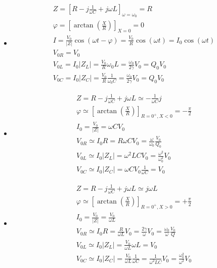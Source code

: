 \begin{itemize}
  \item[$\omega=\omega_0$]
    \begin{gather}
      Z = \left[R-j\frac{1}{\omega C}+j\omega L\right]_{\omega=\omega_0}=R\\
      \varphi = \left[\arctan\left(\frac{X}{R}\right)\right]_{X=0}=0\\
      I = \frac{V_0}{|Z|}\cos\left(\omega t-\varphi\right)=\frac{V_0}{R}\cos(\omega t)=I_0\cos(\omega t)\\
      V_{0R}=V_0\\
      V_{0L}=I_0|Z_L|=\frac{V_0}{R}\omega_0 L=\frac{\omega_0}{2\gamma}V_0=Q_0V_0\\
      V_{0C}=I_0|Z_C|=\frac{V_0}{R}\frac{1}{\omega_0 C}=\frac{\omega_0}{2\gamma}V_0=Q_0V_0
    \end{gather}
  \item[$\omega\ll\omega_0$]
    \begin{gather}
      Z=R-j\frac{1}{\omega C}+j\omega L\simeq -\frac{1}{\omega C}j\\
      \varphi \simeq \left[\arctan\left(\frac{X}{R}\right)\right]_{R=0^+,X<0}=-\frac{\pi}{2}\\
      I_0 = \frac{V_0}{|Z|}=\omega C V_0\\
      V_{0R}\simeq I_0R=R\omega C V_0=\frac{\omega}{\omega_0}\frac{V_0}{Q_0}\\
      V_{0L}\simeq I_0|Z_L|=\omega^2LCV_0=\frac{\omega^2}{\omega_0^2}V_0\\
      V_{0C}\simeq I_0|Z_C|=\omega C V_0\frac{1}{\omega C}=V_0
    \end{gather}
  \item[$\omega\gg\omega_0$]
    \begin{gather}
      Z=R-j\frac{1}{\omega C}+j\omega L\simeq j\omega L\\
      \varphi \simeq \left[\arctan\left(\frac{X}{R}\right)\right]_{R=0^+,X>0}=+\frac{\pi}{2}\\
      I_0 = \frac{V_0}{|Z|}= \frac{V_0}{\omega L}\\
      V_{0R}\simeq I_0R=\frac{R}{\omega L}V_0=\frac{2\gamma}{\omega}V_0=\frac{\omega_0}{\omega}\frac{V_0}{Q}\\
      V_{0L}\simeq I_0|Z_L|=\frac{V_0}{\omega L}\omega L=V_0\\
      V_{0C}\simeq I_0|Z_C|=\frac{V_0}{\omega L}\frac{1}{\omega C}=\frac{1}{\omega^2 LC}V_0=\frac{\omega_0^2}{\omega^2}V_0
    \end{gather}
\end{itemize}
